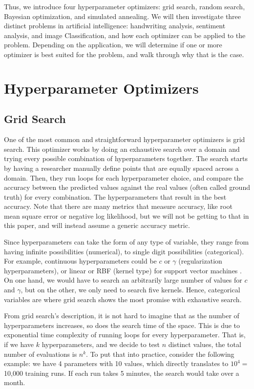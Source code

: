 \documentclass[stu,12pt,floatsintext]{apa7}
\begin{document}
Thus, we introduce four hyperparameter optimizers: grid search, random search, Bayesian optimization, and simulated annealing. We will then investigate three distinct problems in artificial intelligence: handwriting analysis, sentiment analysis, and image Classification, and how each optimizer can be applied to the problem. Depending on the application, we will determine if one or more optimizer is best suited for the problem, and walk through why that is the case. 

\section{Hyperparameter Optimizers}

\subsection{Grid Search}

One of the most common and straightforward hyperparameter optimizers is grid search. This optimizer works by doing an exhaustive search over a domain and trying every possible combination of hyperparameters together. The search starts by having a researcher manually define points that are equally spaced across a domain. Then, they run loops for each hyperparameter choice, and compare the accuracy between the predicted values against the real values (often called ground truth) for every combination. The hyperparameters that result in the best accuracy. Note that there are many metrics that measure accuracy, like root mean square error or negative log likelihood, but we will not be getting to that in this paper, and will instead assume a generic accuracy metric.

Since hyperparameters can take the form of any type of variable, they range from having infinite possibilities (numerical), to single digit possibilities (categorical). For example, continuous hyperparameters could be \(c\) or \(\gamma\) (regularization hyperparameters), or linear or RBF (kernel type) for support vector machines \parencite{scikitlearn_2019_sklearnsvmsvc}. On one hand, we would have to search an arbitrarily large number of values for \(c\) and \(\gamma\), but on the other, we only need to search five kernels. Hence, categorical variables are where grid search shows the most promise with exhaustive search. 

From grid search's description, it is not hard to imagine that as the number of hyperparameters increases, so does the search time of the space. This is due to exponential time complexity of running loops for every hyperparameter. That is, if we have \(k\) hyperparameters, and we decide to test \(n\) distinct values, the total number of evaluations is \(n^{k}\). To put that into practice, consider the following example: we have 4 parameters with 10 values, which directly translates to \(10^{4} =\) 10,000 training runs. If each run takes 5 minutes, the search would take over a month. 
\end{document}
